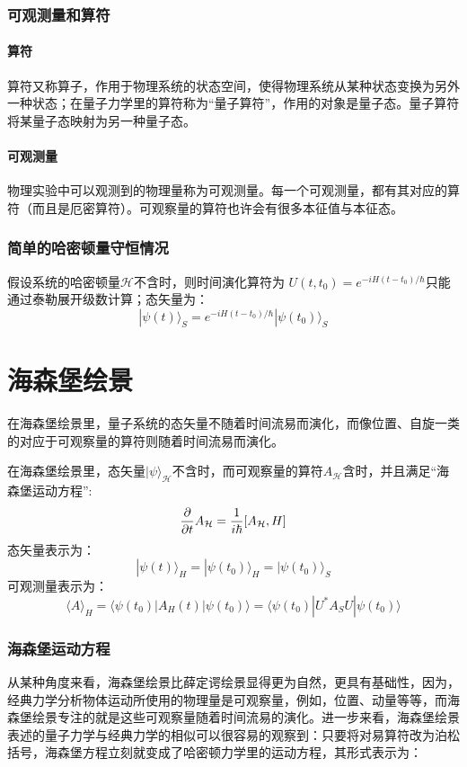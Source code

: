 \documentclass[%
 reprint,
 amsmath,amssymb,
 aps,
]{revtex4-1}
\begin{document}
\subsubsection{可观测量和算符}
\paragraph{算符}
算符又称算子，作用于物理系统的状态空间，使得物理系统从某种状态变换为另外一种状态；在量子力学里的算符称为“量子算符”，作用的对象是量子态。量子算符将某量子态映射为另一种量子态。

\paragraph{可观测量}
物理实验中可以观测到的物理量称为可观测量。每一个可观测量，都有其对应的算符（而且是厄密算符）。可观察量的算符也许会有很多本征值与本征态。

\subsubsection{简单的哈密顿量守恒情况}
假设系统的哈密顿量$\mathcal{H}$不含时，则时间演化算符为
$U(t,t_{0})= e^{-iH(t-t_{0})/\hbar}$只能通过泰勒展开级数计算；态矢量为：
$$|\psi(t)\rangle_S=e^{-iH(t-t_{0})/\hbar} |\psi(t_0)\rangle_S$$



\section{\label{sec:level1}海森堡绘景}

在海森堡绘景里，量子系统的态矢量不随着时间流易而演化，而像位置、自旋一类的对应于可观察量的算符则随着时间流易而演化。

在海森堡绘景里，态矢量$|\psi \rangle _{\mathcal {H}}$不含时，而可观察量的算符$A_{\mathcal {H}}$含时，并且满足“海森堡运动方程”:
$$ \frac {\partial }{\partial {t}}A_{\mathcal {H}}={1 \over i\hbar }[A_{\mathcal {H}},H]$$
态矢量表示为：$$|\psi(t) \rangle_H = |\psi(t_0) \rangle_H = |\psi(t_0) \rangle_S$$
可观测量表示为：$$\langle A \rangle_H = \langle \psi(t_0) | A_H(t) | \psi(t_0) \rangle = \langle \psi(t_0) |U^* A_S U |\psi(t_0) \rangle$$

\subsubsection{海森堡运动方程}
从某种角度来看，海森堡绘景比薛定谔绘景显得更为自然，更具有基础性，因为，经典力学分析物体运动所使用的物理量是可观察量，例如，位置、动量等等，而海森堡绘景专注的就是这些可观察量随着时间流易的演化。进一步来看，海森堡绘景表述的量子力学与经典力学的相似可以很容易的观察到：只要将对易算符改为泊松括号，海森堡方程立刻就变成了哈密顿力学里的运动方程，其形式表示为：
\end{document}
